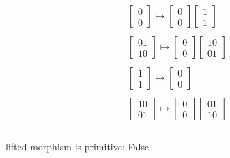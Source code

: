 $$\begin{array}{l}\begin{bmatrix}0\\ 0\end{bmatrix} \mapsto \begin{bmatrix}0\\ 0\end{bmatrix} \begin{bmatrix}1\\ 1\end{bmatrix}\\\\ \begin{bmatrix}01\\ 10\end{bmatrix} \mapsto \begin{bmatrix}0\\ 0\end{bmatrix} \begin{bmatrix}10\\ 01\end{bmatrix}\\\\ \begin{bmatrix}1\\ 1\end{bmatrix} \mapsto \begin{bmatrix}0\\ 0\end{bmatrix}\\\\ \begin{bmatrix}10\\ 01\end{bmatrix} \mapsto \begin{bmatrix}0\\ 0\end{bmatrix} \begin{bmatrix}01\\ 10\end{bmatrix}\\\end{array}$$ \\
lifted morphism is primitive: False \\
\noindent\makebox[\linewidth]{\rule{\paperwidth}{0.4pt}}

